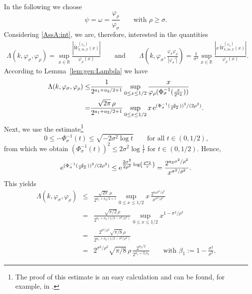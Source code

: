\documentclass[namedate,webpdf,imanum]{ima-authoring-arxiv}%
\theoremstyle{thmstyletwo}%
\numberwithin{equation}{section}
\begin{document}
In the following we choose 
\begin{equation}\label{eq_psi_1}
\psi=\omega=\frac{\varphi_\rho}{\varphi_\sigma}\qquad \mbox{with $\rho\ge \sigma$.} 
\end{equation}
Considering \eqref{AssA:int}, we are, therefore, interested in the quantities
\begin{align*}
\Lambda(k,\varphi_{\sigma}, \varphi_{\rho})=\sup_{x \in \mathbb{R}} \frac{|\widetilde{W}^{(\varphi_\sigma)}_{k, m, 2}(x)|}{\varphi_\rho(x)} \qquad \mbox{and} \qquad \Lambda\left(k,\varphi_{\sigma}, \frac{\varphi_{\sigma} \varphi_{\rho}}{|\varphi_{\sigma}'|}\right)=\frac{1}{\sigma^2}\sup_{x \in \mathbb{R}}  \frac{|x\,\widetilde{W}_{k,m,2}^{(\varphi_{\sigma})}(x)|}{\varphi_\rho(x)}. 
\end{align*}
According to Lemma~\ref{lem:gen:Lambda} we have
\begin{align*}
\Lambda(k,\varphi_{\sigma}, \varphi_{\rho}) \le & \frac{1}{2^{a_1+a_2/2+1}} \sup_{0 \le x \le 1/2} \frac{x}{\varphi_\rho(\Phi^{-1}_\sigma(\frac{x}{2^{a_2}}))} \\ = &  \frac{\sqrt{2 \pi} \, \rho}{2^{a_1+a_2/2+1}} \sup_{0 \le x \le 1/2} x \, {\rm e}^{(\Phi^{-1}_\sigma(\frac{x}{2^{a_2}}))^2/(2 \rho^2)}.
\end{align*}
Next, we use the estimate\footnote{The proof of this estimate is an easy calculation and can be found, for example, in \citet[pp.~332]{DKP22}.} 
\begin{equation*}
0 \le -\Phi_{\sigma}^{-1}(t) \le \sqrt{-2 \sigma^2 \log t} \qquad \mbox{for all $t \in (0,1/2)$,}
\end{equation*}
from which we obtain $(\Phi_{\sigma}^{-1}(t))^2 \le 2 \sigma^2 \log \frac{1}{t}$ for $t \in (0,1/2)$. Hence, 
$${\rm e}^{(\Phi^{-1}_\sigma(\frac{x}{2^{a_2}}))^2/(2\rho^2)} \le {\rm e}^{\tfrac{2 \sigma^2}{2\rho^2} \log \left(\frac{2^{a_2}}{x}\right)}=\frac{2^{a_2 \sigma^2 / \rho^2}}{x^{\sigma^2 / \rho^2}}.$$ This yields
\begin{eqnarray}\label{eq_beta1}
\Lambda(k,\varphi_{\sigma}, \varphi_{\rho}) & \le &  \frac{\sqrt{2 \pi} \, \rho}{2^{a_1+a_2/2+1}} \sup_{0 \le x \le 1/2} x \, \frac{2^{a_2 \sigma^2 / \rho^2}}{x^{\sigma^2/\rho^2}}\nonumber\\
& = & \frac{\sqrt{\pi/2} \, \rho}{2^{a_1+a_2(1/2- \sigma^2 /\rho^2)}} \sup_{0 \le x \le 1/2} x^{1- \sigma^2 / \rho^2}\nonumber\\
& = & \frac{2^{\sigma^2 / \rho^2} \sqrt{\pi/8} \, \rho}{2^{a_1+a_2(1/2-\sigma^2/\rho^2)}}\nonumber\\
& = & 2^{\sigma^2 / \rho^2} \sqrt{\pi/8} \, \rho\, \frac{2^{a_2/2}}{2^{a_1+\beta_1 a_2}} \qquad \mbox{with $\beta_1:=1- \frac{\sigma^2}{\rho^2}$.}
\end{eqnarray}
\end{document}
